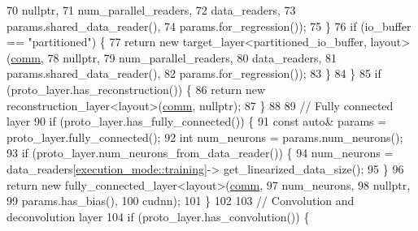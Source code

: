 \begin{DoxyCode}
70                                                              \textcolor{keyword}{nullptr},
71                                                              num\_parallel\_readers,
72                                                              data\_readers,
73                                                              params.shared\_data\_reader(),
74                                                              params.for\_regression());
75     \}
76     \textcolor{keywordflow}{if} (io\_buffer == \textcolor{stringliteral}{"partitioned"}) \{
77       \textcolor{keywordflow}{return} \textcolor{keyword}{new} target\_layer<partitioned\_io\_buffer, layout>(\hyperlink{file__io_8cpp_ab048c6f9fcbcfaa57ce68b00263dbebe}{comm},
78                                                              \textcolor{keyword}{nullptr},
79                                                              num\_parallel\_readers,
80                                                              data\_readers,
81                                                              params.shared\_data\_reader(),
82                                                              params.for\_regression());
83     \}
84   \}
85   \textcolor{keywordflow}{if} (proto\_layer.has\_reconstruction()) \{
86     \textcolor{keywordflow}{return} \textcolor{keyword}{new} reconstruction\_layer<layout>(\hyperlink{file__io_8cpp_ab048c6f9fcbcfaa57ce68b00263dbebe}{comm}, \textcolor{keyword}{nullptr});
87   \}
88 
89   \textcolor{comment}{// Fully connected layer}
90   \textcolor{keywordflow}{if} (proto\_layer.has\_fully\_connected()) \{
91     \textcolor{keyword}{const} \textcolor{keyword}{auto}& params = proto\_layer.fully\_connected();
92     \textcolor{keywordtype}{int} num\_neurons = params.num\_neurons();
93     \textcolor{keywordflow}{if} (proto\_layer.num\_neurons\_from\_data\_reader()) \{
94       num\_neurons = data\_readers[\hyperlink{base_8hpp_a2781a159088df64ed7d47cc91c4dc0a8ac185ddac8b5a8f5aa23c5b80bc12d214}{execution\_mode::training}]->
      get\_linearized\_data\_size();
95     \}
96     \textcolor{keywordflow}{return} \textcolor{keyword}{new} fully\_connected\_layer<layout>(\hyperlink{file__io_8cpp_ab048c6f9fcbcfaa57ce68b00263dbebe}{comm},
97                                              num\_neurons,
98                                              \textcolor{keyword}{nullptr},
99                                              params.has\_bias(),
100                                              cudnn);
101   \}
102 
103   \textcolor{comment}{// Convolution and deconvolution layer}
104   \textcolor{keywordflow}{if} (proto\_layer.has\_convolution()) \{

\end{DoxyCode}
